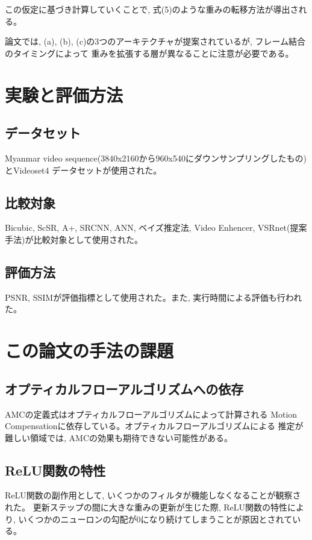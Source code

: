 \documentclass[dvipdfmx,a4j,10pt, twocolumn]{jsarticle}
\begin{document}
この仮定に基づき計算していくことで, 式(5)のような重みの転移方法が導出される。

論文では, (a), (b), (c)の3つのアーキテクチャが提案されているが, フレーム結合のタイミングによって
重みを拡張する層が異なることに注意が必要である。

\section*{実験と評価方法}

\subsection*{データセット}
Myanmar video sequence(3840x2160から960x540にダウンサンプリングしたもの)とVideoset4
データセットが使用された。

\subsection*{比較対象}
Bicubic, ScSR, A+, SRCNN, ANN, ベイズ推定法, Video Enhencer, VSRnet(提案手法)が比較対象として使用された。
\subsection*{評価方法}
PSNR, SSIMが評価指標として使用された。また, 実行時間による評価も行われた。


\section*{この論文の手法の課題}

\subsection*{オプティカルフローアルゴリズムへの依存}

AMCの定義式はオプティカルフローアルゴリズムによって計算される
Motion Compensationに依存している。オプティカルフローアルゴリズムによる
推定が難しい領域では, AMCの効果も期待できない可能性がある。

\subsection*{ReLU関数の特性}

ReLU関数の副作用として, いくつかのフィルタが機能しなくなることが観察された。
更新ステップの間に大きな重みの更新が生じた際, 
ReLU関数の特性により, いくつかのニューロンの勾配が0になり続けてしまうことが原因とされている。
\end{document}
